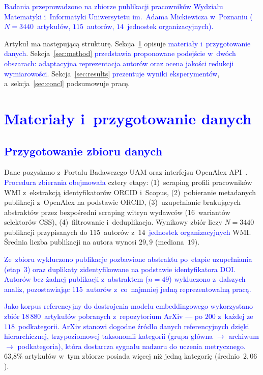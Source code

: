 \documentclass[a4paper,11pt,twocolumn]{article}
\newcommand{\hl}[1]{\textcolor{blue}{#1}}
\begin{document}
\hl{Badania przeprowadzono na zbiorze publikacji pracowników
Wydziału Matematyki i~Informatyki Uniwersytetu im.~Adama Mickiewicza
w~Poznaniu ($N=3440$~artykułów, $115$~autorów, $14$~jednostek
organizacyjnych).}

Artykuł ma następującą strukturę. Sekcja~\ref{sec:data} opisuje
\hl{materiały i~przygotowanie danych}.
Sekcja~\ref{sec:method} \hl{przedstawia proponowane podejście
w~dwóch obszarach: adaptacyjna reprezentacja autorów oraz ocena
jakości redukcji wymiarowości}.
Sekcja~\ref{sec:results} \hl{prezentuje wyniki eksperymentów},
a~sekcja~\ref{sec:concl} podsumowuje pracę.


\section{\hl{Materiały i~przygotowanie danych}}
\label{sec:data}

\subsection{\hl{Przygotowanie zbioru danych}}

Dane pozyskano z~Portalu Badawczego UAM oraz interfejsu OpenAlex
API~\cite{openalex}.
\hl{Procedura zbierania obejmowała} cztery etapy: (1)~scraping profili
pracowników WMI z~ekstrakcją identyfikatorów ORCID i~Scopus,
(2)~pobieranie metadanych publikacji z~OpenAlex na podstawie ORCID,
(3)~uzupełnianie brakujących abstraktów przez bezpośredni scraping
witryn wydawców (16~wariantów selektorów CSS), (4)~filtrowanie
i~deduplikacja. Wynikowy zbiór liczy $N=3440$ publikacji przypisanych
do $115$~autorów z~$14$~\hl{jednostek organizacyjnych} WMI. Średnia
liczba publikacji na autora wynosi $29{,}9$ (mediana~$19$).

\hl{Ze~zbioru wykluczono publikacje pozbawione abstraktu po~etapie
uzupełniania (etap~3) oraz duplikaty zidentyfikowane na podstawie
identyfikatora DOI. Autorów bez żadnej publikacji z~abstraktem
($n=49$) wykluczono z~dalszych analiz, pozostawiając $115$~autorów
z~co~najmniej jedną reprezentowalną pracą.}

\hl{Jako korpus referencyjny do dostrojenia modelu embeddingowego
wykorzystano zbiór $18\,880$~artykułów pobranych z~repozytorium ArXiv
--- po $200$ z~każdej ze~$118$~podkategorii. ArXiv stanowi dogodne
źródło danych referencyjnych dzięki hierarchicznej, trzypoziomowej
taksonomii kategorii (grupa główna $\to$ archiwum $\to$ podkategoria),
która dostarcza sygnału nadzoru do uczenia metrycznego.}
63,8\% artykułów w~tym zbiorze posiada więcej niż jedną kategorię
(średnio~$2{,}06$).
\end{document}
